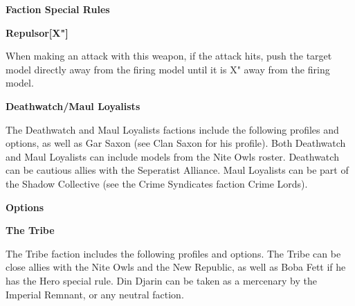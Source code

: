 \documentclass{article}
\begin{document}
{\large \textbf{Faction Special Rules}}
\vspace{0.3cm}
\begin{multicols}{2}
    {\scriptsize

    \begin{minipage}{9cm}
        {\normalsize \textbf{Repulsor[X"]}}
        \vspace{0.3cm}

        When making an attack with this weapon, if the attack hits,
        push the target model directly away from the firing model
        until it is X" away from the firing model.
    \end{minipage}

    }
\end{multicols}

\newpage

{\Large \textbf{Deathwatch/Maul Loyalists}}
\vspace{0.3cm}

\begin{minipage}{19cm}
    The Deathwatch and Maul Loyalists factions include the following profiles and
    options, as well as Gar Saxon (see Clan Saxon for his profile).
    Both Deathwatch and Maul Loyalists can include models from the Nite Owls roster.
    Deathwatch can be cautious allies with the Seperatist Alliance.
    Maul Loyalists can be part of the Shadow Collective (see the Crime Syndicates faction
    Crime Lords).
\end{minipage}

\vspace{0.3cm}
{\scriptsize
\setlength\extrarowheight{1.5pt}

}
\vspace{0.6cm}

{\large \textbf{Options}}
\vspace{0.3cm}
\begin{multicols}{2}
    {\scriptsize

    \setlength\extrarowheight{1.5pt}
    

    }
\end{multicols}
\vspace{0.6cm}

{\Large \textbf{The Tribe}}
\vspace{0.3cm}

\begin{minipage}{19cm}
    The Tribe faction includes the following profiles and options.
    The Tribe can be close allies with the Nite Owls and the New Republic, as well as
    Boba Fett if he has the Hero special rule.
    Din Djarin can be taken as a mercenary by the Imperial Remnant,
    or any neutral faction.
\end{minipage}
\end{document}
